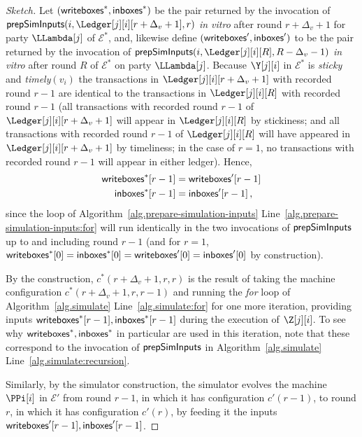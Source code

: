 \begin{proof}[Sketch]
  Let $(\textsf{writeboxes}^*, \textsf{inboxes}^*)$
  be the pair
  returned by the invocation of $\prepareSimulationInputs(i, \Ledger[j][i][r + \Delta_v + 1], r)$
  \emph{in vitro} after round $r + \Delta_v + 1$ for party $\LLambda[j]$ of $\mathcal{E}^*$, and, likewise define
  $(\textsf{writeboxes}', \textsf{inboxes}')$ to be the pair
  returned by the invocation of $\prepareSimulationInputs(i, \Ledger[j][i][R], R - \Delta_v - 1)$
  \emph{in vitro} after round $R$ of $\mathcal{E}^*$ on party $\LLambda[j]$.
  Because $\Y[j][i]$ in $\mathcal{E}^*$ is \emph{sticky} and \emph{timely}$(v_i)$
  the transactions in
  $\Ledger[j][i][r + \Delta_v + 1]$ with recorded round $r - 1$ are identical to
  the transactions in $\Ledger[j][i][R]$ with recorded round $r - 1$
  (all transactions with recorded round $r - 1$ of $\Ledger[j][i][r + \Delta_v + 1]$
   will appear in $\Ledger[j][i][R]$ by stickiness;
   and all transactions with recorded round $r - 1$ of $\Ledger[j][i][R]$ will
   have appeared in $\Ledger[j][i][r + \Delta_v + 1]$ by timeliness; in the case of
   $r = 1$, no transactions with recorded round $r - 1$ will appear in either
   ledger).
  Hence,
  \begin{align}
    \textsf{writeboxes}^*[r - 1] &= \textsf{writeboxes}'[r - 1]\label{conj:simulation:eq-inputs-writes}\\
    \textsf{inboxes}^*[r - 1] &= \textsf{inboxes}'[r - 1]\label{conj:simulation:eq-inputs-inboxes}\,,
  \end{align}
  since the loop of Algorithm~\ref{alg.prepare-simulation-inputs} Line~\ref{alg.prepare-simulation-inputs:for}
  will run identically in the two invocations of $\textsf{prepSimInputs}$ up to
  and including round $r - 1$ (and for
  $r = 1$, $\textsf{writeboxes}^*[0] = \textsf{inboxes}^*[0] = \textsf{writeboxes}'[0] = \textsf{inboxes}'[0]$ by construction).

  By the \rollerblade construction,
  $c^*(r + \Delta_v + 1, r, r)$ is the result of
  taking the machine configuration
  $c^*(r + \Delta_v + 1, r, r - 1)$
  and running the \emph{for} loop of Algorithm~\ref{alg.simulate} Line~\ref{alg.simulate:for}
  for one more iteration, providing inputs $\textsf{writeboxes}^*[r - 1], \textsf{inboxes}^*[r - 1]$
  during the execution of $\Z[j][i]$.
  To see why $\textsf{writeboxes}^*, \textsf{inboxes}^*$ in particular are used in this iteration,
  note that these correspond to the invocation of $\textsf{prepSimInputs}$ in
  Algorithm~\ref{alg.simulate} Line~\ref{alg.simulate:recursion}.

  Similarly, by the simulator construction, %
  the simulator evolves the machine $\PPi[i]$ in $\mathcal{E}'$ from round $r - 1$,
  in which it has configuration $c'(r - 1)$,
  to round $r$,
  in which it has configuration $c'(r)$,
  by feeding it the inputs $\textsf{writeboxes}'[r - 1], \textsf{inboxes}'[r - 1]$.


\end{proof}
